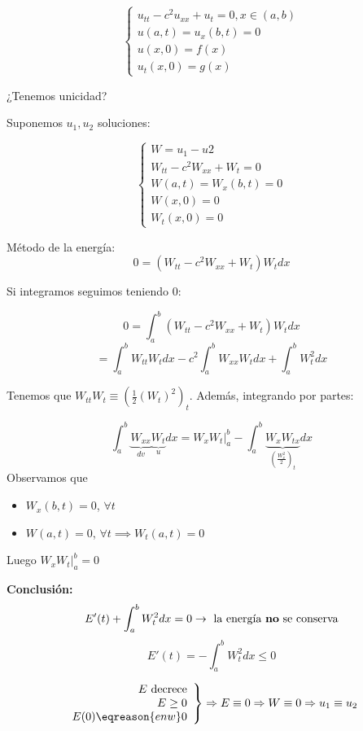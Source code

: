 			\begin{problem}

				\[\begin{cases}
					u_{tt} - c^2u_{xx} + u_t = 0, x \in (a,b)\\
					u(a,t) = u_x (b,t) = 0\\
					u(x,0) = f(x) \\
					u_t(x,0) = g(x)
				\end{cases}\]

				¿Tenemos unicidad?

				\solution

				Suponemos $u_1,u_2$ soluciones:

				\[ \begin{cases} W = u_1 - u2 \\
				W_{tt} - c^2 W_{xx} + W_t = 0 \\
				W(a,t) = W_x (b,t) = 0\\
				W(x,0) = 0\\
				W_t (x,0) = 0
				\end{cases}\]

				Método de la energía:
				\[ 0 = (W_{tt} - c^2 W_{xx} + W_t) W_t dx\]

				Si integramos seguimos teniendo 0:

				\[ 0 = \int_a^b (W_{tt} - c^2 W_{xx} + W_t) W_t dx\]
				\[ = \int_a^b W_{tt} W_t dx - c^2 \int^b_a W_{xx} W_t dx + \int_{a}^b W^2_t dx  \]

				Tenemos que $W_{tt}W_t \equiv (\frac{1}{2} (W_t)^2)_t $. Además, integrando por partes:

				\[ \int_a^b \underbrace{W_{xx}}_{dv} \underbrace{W_t}_{u} dx = W_x W_t |_a^b - \int_a^b \underbrace{W_x W_{tx}}_{(\frac{W_x^2}{2})_t} dx \]
				Observamos que
				\begin{itemize}
					\item $W_x (b,t) = 0$, $\forall t $
					\item $W(a,t) = 0$, $\forall t \implies W_t (a,t) = 0$
				\end{itemize}
				Luego $W_x W_t |_a^b = 0$

				{\bf Conclusión:}
				\[ E'(t) + \int_a^b W_t^2 dx = 0 \rightarrow \text{ la energía {\bf no} se conserva}\]
				\[ E'(t) = -\int_a^b W_t^2 dx \leq 0 \]

				\[ \left. \begin{array}{r}
					E \text{ decrece} \\
					E \geq 0 \\
					E(0) \eqreason{en w} 0 \end{array} \right\} \Rightarrow E \equiv 0 \Rightarrow W \equiv 0 \Rightarrow u_1 \equiv u_2 \]

			\end{problem}


